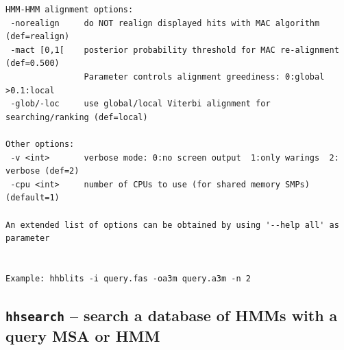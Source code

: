 \documentclass[11pt,a4paper]{article}
\begin{document}
\begin{verbatim}
HMM-HMM alignment options:                                                               
 -norealign     do NOT realign displayed hits with MAC algorithm (def=realign)           
 -mact [0,1[    posterior probability threshold for MAC re-alignment (def=0.500)          
                Parameter controls alignment greediness: 0:global >0.1:local             
 -glob/-loc     use global/local Viterbi alignment for searching/ranking (def=local)     

Other options:                                                                           
 -v <int>       verbose mode: 0:no screen output  1:only warings  2: verbose (def=2)    
 -cpu <int>     number of CPUs to use (for shared memory SMPs) (default=1)               

An extended list of options can be obtained by using '--help all' as parameter           


Example: hhblits -i query.fas -oa3m query.a3m -n 2       
\end{verbatim} \normalsize


\subsection{{\tt hhsearch} -- search a database of HMMs with a query MSA or HMM}
\end{document}
